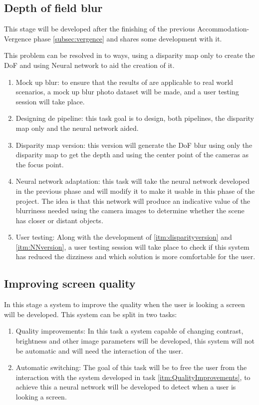 \documentclass[10pt,a4paper,twocolumn,twoside]{article}
\begin{document}
	\subsection{Depth of field blur}
	This stage will be developed after the finishing of the previous Accommodation-Vergence phase \ref{subsec:vergence} and shares some development with it. 
	
	This problem can be resolved in to ways, using a disparity map only to create the DoF and using Neural network to aid the creation of it.
	
	\begin{enumerate}
		\item Mock up blur: to ensure that the results of \cite{ifftConfortDoF} are applicable to real world scenarios, a mock up blur photo dataset will be made, and a user testing session will take place.
		
		\item Designing de pipeline: this task goal is to design, both pipelines, the disparity map only and the neural network aided.
		
		\item \label{itm:disparityversion} Disparity map version: this version will generate the DoF blur using only the disparity map to get the depth and using the center point of the cameras as the focus point.
		
		\item \label{itm:NNversion} Neural network adaptation: this task will take the neural network developed in the previous phase and will modify it to make it usable in this phase of the project. The idea is that this network will produce an indicative value of the blurriness needed using the camera images to determine whether the scene has closer or distant objects.
		
		\item User testing: Along with the development of \ref{itm:disparityversion} and \ref{itm:NNversion}, a user testing session will take place to check if this system has reduced the dizziness and which solution is more comfortable for the user.
	\end{enumerate}
	
	\subsection{Improving screen quality}
	In this stage a system to improve the quality when the user is looking a screen will be developed. This system can be split in two tasks:
	\begin{enumerate}
		\item \label{itm:QualityImprovements} Quality improvements: In this task a system capable of changing contrast, brightness and other image parameters will be developed, this system will not be automatic and will need the interaction of the user.
		
		\item Automatic switching: The goal of this task will be to free the user from the interaction with the system developed in task \ref{itm:QualityImprovements}, to achieve this a neural network will be developed to detect when a user is looking a screen.
	\end{enumerate}
	
\end{document}

